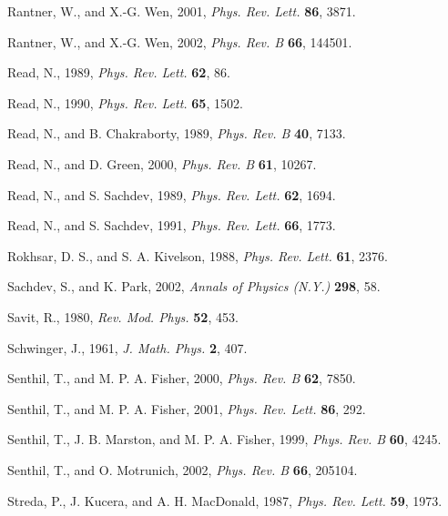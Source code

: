 \begin{list}{}{\setlength{\leftmargin}{2em}\setlength{\itemindent}{-2em}}
\item Rantner, W., and X.-G. Wen, 2001, \emph{Phys. Rev. Lett.} \textbf{86}, 3871.
\item Rantner, W., and X.-G. Wen, 2002, \emph{Phys. Rev. B} \textbf{66}, 144501.
\item Read, N., 1989, \emph{Phys. Rev. Lett.} \textbf{62}, 86.
\item Read, N., 1990, \emph{Phys. Rev. Lett.} \textbf{65}, 1502.
\item Read, N., and B. Chakraborty, 1989, \emph{Phys. Rev. B} \textbf{40}, 7133.
\item Read, N., and D. Green, 2000, \emph{Phys. Rev. B} \textbf{61}, 10267.
\item Read, N., and S. Sachdev, 1989, \emph{Phys. Rev. Lett.} \textbf{62}, 1694.
\item Read, N., and S. Sachdev, 1991, \emph{Phys. Rev. Lett.} \textbf{66}, 1773.
\item Rokhsar, D. S., and S. A. Kivelson, 1988, \emph{Phys. Rev. Lett.} \textbf{61}, 2376.
\item Sachdev, S., and K. Park, 2002, \emph{Annals of Physics (N.Y.)} \textbf{298}, 58.
\item Savit, R., 1980, \emph{Rev. Mod. Phys.} \textbf{52}, 453.
\item Schwinger, J., 1961, \emph{J. Math. Phys.} \textbf{2}, 407.
\item Senthil, T., and M. P. A. Fisher, 2000, \emph{Phys. Rev. B} \textbf{62}, 7850.
\item Senthil, T., and M. P. A. Fisher, 2001, \emph{Phys. Rev. Lett.} \textbf{86}, 292.
\item Senthil, T., J. B. Marston, and M. P. A. Fisher, 1999, \emph{Phys. Rev. B} \textbf{60}, 4245.
\item Senthil, T., and O. Motrunich, 2002, \emph{Phys. Rev. B} \textbf{66}, 205104.
\item Streda, P., J. Kucera, and A. H. MacDonald, 1987, \emph{Phys. Rev. Lett.} \textbf{59}, 1973.


\end{list}
